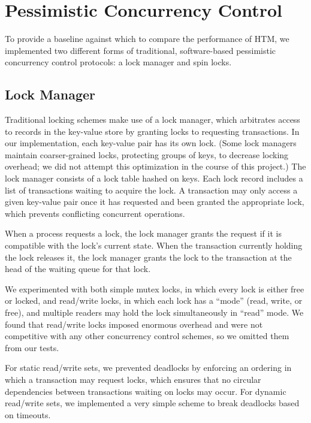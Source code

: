 \section{Pessimistic Concurrency Control} \label{sec:pessimistic}

To provide a baseline against which to compare the performance of HTM, we
implemented two different forms of traditional, software-based pessimistic
concurrency control protocols: a lock manager and spin locks.

\subsection{Lock Manager}

Traditional locking schemes make use of a lock manager, which arbitrates access
to records in the key-value store by granting locks to requesting transactions.
In our implementation, each key-value pair has its own lock. (Some lock managers
maintain coarser-grained locks, protecting groups of keys, to decrease locking
overhead; we did not attempt this optimization in the course of this project.)
The lock manager consists of a lock table hashed on keys. Each lock record
includes a list of transactions waiting to acquire the lock. A transaction may
only access a given key-value pair once it has requested and been granted the
appropriate lock, which prevents conflicting concurrent operations.

When a process requests a lock, the lock manager grants the request if it is
compatible with the lock's current state. When the transaction currently holding
the lock releases it, the lock manager grants the lock to the transaction at the
head of the waiting queue for that lock.

We experimented with both simple mutex locks, in which every lock is either free
or locked, and read/write locks, in which each lock has a ``mode'' (read, write,
or free), and multiple readers may hold the lock simultaneously in ``read''
mode. We found that read/write locks imposed enormous overhead and were not
competitive with any other concurrency control schemes, so we omitted them from
our tests.

For static read/write sets, we prevented deadlocks by enforcing an ordering in
which a transaction may request locks, which ensures that no circular
dependencies between transactions waiting on locks may occur. For dynamic
read/write sets, we implemented a very simple scheme to break deadlocks
based on timeouts.\\

